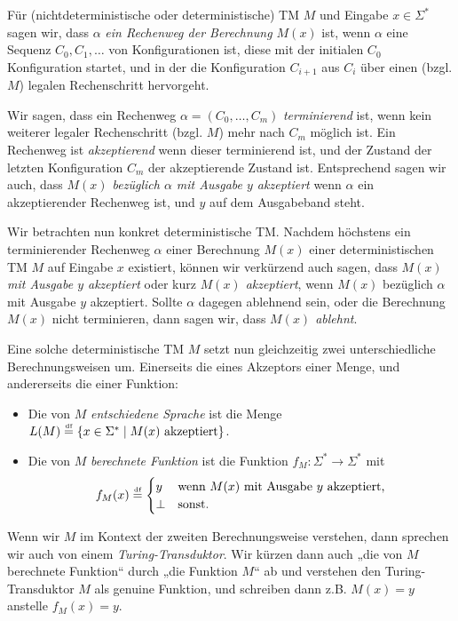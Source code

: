 Für (nichtdeterministische oder deterministische) TM $M$ und Eingabe $x\in\Sigma^*$ sagen wir, dass $\alpha$ \emph{ein Rechenweg der Berechnung $M(x)$} ist, wenn $\alpha$ eine Sequenz $C_0, C_1, \dots$ von Konfigurationen ist, diese mit der initialen $C_0$ Konfiguration startet, und in der die Konfiguration $C_{i+1}$ aus $C_i$ über einen (bzgl. $M$) legalen Rechenschritt hervorgeht.

Wir sagen, dass ein Rechenweg $\alpha=(C_0,\dots,C_m)$ \emph{terminierend} ist, wenn kein weiterer legaler Rechenschritt (bzgl. $M$) mehr nach $C_m$ möglich ist.
Ein Rechenweg ist \emph{akzeptierend} wenn dieser terminierend ist, und der Zustand der letzten Konfiguration $C_m$ der akzeptierende Zustand  ist.
Entsprechend sagen wir auch, dass \emph{$M(x)$ bezüglich $\alpha$ mit Ausgabe $y$ akzeptiert} wenn $\alpha$ ein akzeptierender Rechenweg ist, und $y$ auf dem Ausgabeband steht.





Wir betrachten nun konkret deterministische TM.
Nachdem höchstens ein terminierender Rechenweg $\alpha$ einer Berechnung $M(x)$ einer deterministischen TM $M$ auf Eingabe $x$ existiert, können wir verkürzend auch sagen, dass 
\emph{$M(x)$ mit Ausgabe $y$ akzeptiert} oder kurz \emph{$M(x)$ akzeptiert}, wenn $M(x)$ bezüglich $\alpha$ mit Ausgabe $y$ akzeptiert.
Sollte $\alpha$ dagegen ablehnend sein, oder die Berechnung $M(x)$ nicht terminieren, dann sagen wir, dass \emph{$M(x)$ ablehnt}.

Eine solche deterministische TM $M$ setzt nun gleichzeitig zwei unterschiedliche Berechnungsweisen um. Einerseits die eines Akzeptors einer Menge, und andererseits die einer Funktion:
\begin{itemize}
    \item Die von $M$ \emph{entschiedene  Sprache} ist die Menge $L(M)\stackrel{\text{\smash{\tiny df}}}{=}\{ x\in\Sigma^* \mid M(x) \text{ akzeptiert} \}$.
    \item Die von $M$ \emph{berechnete Funktion} ist die Funktion $f_M\colon\Sigma^*\to\Sigma^*$ mit
        \[ f_M(x) \stackrel{\text{\smash{\tiny df}}}{=} \begin{cases} y & \text{wenn $M(x)$ mit Ausgabe $y$ akzeptiert,} \\ \bot & \text{sonst.} \end{cases} \] 
\end{itemize}
Wenn wir $M$ im Kontext der zweiten Berechnungsweise verstehen, dann sprechen wir auch von einem \emph{Turing-Transduktor}. 
Wir kürzen dann auch „die von $M$ berechnete Funktion“ durch „die Funktion $M$“ ab und verstehen den Turing-Transduktor $M$ als genuine Funktion, und schreiben dann z.B. $M(x)=y$ anstelle $f_M(x)=y$.

